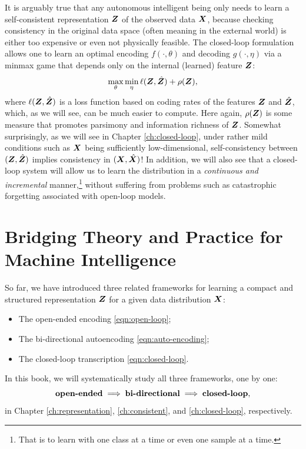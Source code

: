 \documentclass[../../book-main.tex]{subfiles}
\begin{document}
It is arguably true that any  autonomous intelligent being only needs to learn a self-consistent representation $\bm{Z}$ of the observed data $\bm{X}$, because checking consistency in the original data space (often meaning in the external world) is either too expensive or even not physically feasible. The closed-loop formulation allows one to learn an optimal encoding $f(\cdot, \theta)$ and decoding $g(\cdot, \eta)$ via a minmax game that depends only on the internal (learned) feature $\bm{Z}$:
\begin{equation}
\max_{\theta}\min_{\eta} \ell( \bm{Z}, \hat {\bm{Z}}) + \rho(\bm{Z}), 
   \label{eqn:closed-loop-objective}
\end{equation}
where $\ell( \bm{Z}, \hat {\bm{Z}})$ is a loss function based on coding rates of the features $\bm{Z}$ and $\hat {\bm{Z}}$, which, as we will see, can be much easier to compute. Here again, $\rho(\bm{Z})$ is some measure that promotes parsimony and information richness of $\bm{Z}$. Somewhat surprisingly, as we will see in Chapter \ref{ch:closed-loop}, under rather mild conditions such as $\bm{X}$ being sufficiently low-dimensional, self-consistency between $(\bm{Z}, \hat {\bm{Z}})$ implies consistency in $(\bm{X}, \hat {\bm{X}})$! In addition, we will also see that a closed-loop system will allow us to learn the distribution in a {\em continuous and incremental} manner,\footnote{That is to learn with one class at a time or even one sample at a time.} without suffering from problems such as catastrophic forgetting associated with open-loop models. 

\section{Bridging Theory and Practice for Machine Intelligence}
So far, we have introduced three related  frameworks for learning a compact and structured representation $\bm{Z}$ for a given data distribution $\bm{X}$: 
\begin{itemize}
\item The open-ended encoding \eqref{eqn:open-loop};
\item The bi-directional autoencoding \eqref{eqn:auto-encoding};
\item The closed-loop transcription \eqref{eqn:closed-loop}.
\end{itemize}
In this book, we will systematically study all three frameworks, one by one:
\begin{equation}
    \mbox{\textbf{open-ended}} \; \Longrightarrow \; 
    \mbox{\textbf{bi-directional}} \;  \Longrightarrow \; \mbox{\textbf{closed-loop}},
\end{equation}
in Chapter \ref{ch:representation}, \ref{ch:consistent}, and \ref{ch:closed-loop}, respectively.
\end{document}
